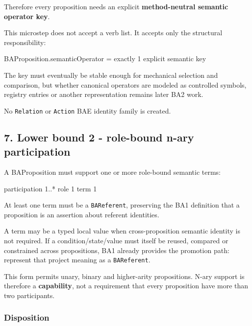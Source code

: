\documentclass[
  10pt,
  letterpaper,
]{article}
\newenvironment{Shaded}{}{}
\newcommand{\NormalTok}[1]{#1}
\begin{document}
Therefore every proposition needs an explicit \textbf{method-neutral
semantic operator key}.

This microstep does not accept a verb list. It accepts only the
structural responsibility:

\begin{Shaded}
\begin{Highlighting}[]
\NormalTok{BAProposition.semanticOperator = exactly 1 explicit semantic key}
\end{Highlighting}
\end{Shaded}

The key must eventually be stable enough for mechanical selection and
comparison, but whether canonical operators are modeled as controlled
symbols, registry entries or another representation remains later BA2
work.

No \texttt{Relation} or \texttt{Action} BAE identity family is created.

\subsection{7. Lower bound 2 - role-bound n-ary
participation}\label{lower-bound-2---role-bound-n-ary-participation}

A BAProposition must support one or more role-bound semantic terms:

\begin{Shaded}
\begin{Highlighting}[]
\NormalTok{participation 1..*}
\NormalTok{    role 1}
\NormalTok{    term 1}
\end{Highlighting}
\end{Shaded}

At least one term must be a \texttt{BAReferent}, preserving the BA1
definition that a proposition is an assertion about referent identities.

A term may be a typed local value when cross-proposition semantic
identity is not required. If a condition/state/value must itself be
reused, compared or constrained across propositions, BA1 already
provides the promotion path: represent that project meaning as a
\texttt{BAReferent}.

This form permits unary, binary and higher-arity propositions. N-ary
support is therefore a \textbf{capability}, not a requirement that every
proposition have more than two participants.

\subsubsection{Disposition}\label{disposition-3}
\end{document}
